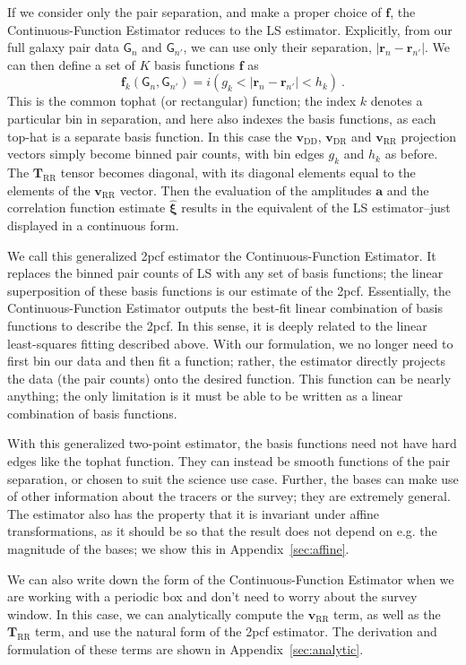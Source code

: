 \documentclass[modern]{aastex62}
\newcommand{\cf}{2pcf\xspace} %
\newcommand{\est}{the Continuous-Function Estimator\xspace}
\newcommand{\LS}{LS\xspace}
\newcommand{\bld}[1]{\bm{#1}} %
\newcommand{\vv}[1]{\bld{v}_\mathrm{#1}}
\newcommand{\TT}[1]{\bld{T}_\mathrm{#1}}
\newcommand{\ff}{\bld{f}}
\newcommand{\GG}[1]{\mathsf{G}_{#1}}
\begin{document}
If we consider only the pair separation, and make a proper choice of $\ff$, \est reduces to the \LS estimator.
Explicitly, from our full galaxy pair data $\GG{n}$ and $\GG{n'}$, we can use only their separation,  $|\bld{r}_n - \bld{r}_{n'}|$.
We can then define a set of $K$ basis functions $\ff$ as
\begin{equation}
\ff_k(\GG{n}, \GG{n'}) =  i(g_k < |\bld{r}_n - \bld{r}_{n'}| < h_k) ~.
\end{equation}
This is the common tophat (or rectangular) function; the index $k$ denotes a particular bin in separation, and here also indexes the basis functions, as each top-hat is a separate basis function.
In this case the $\vv{DD}$, $\vv{DR}$ and $\vv{RR}$ projection vectors simply become binned pair counts, with bin edges $g_k$ and $h_k$ as before.
The $\TT{RR}$ tensor becomes diagonal, with its diagonal elements equal to the elements of the $\vv{RR}$ vector.
Then the evaluation of the amplitudes $\bld{a}$ and the correlation function estimate $\bld{\hat{\xi}}$ results in the equivalent of the \LS estimator--just displayed in a continuous form.

We call this generalized \cf estimator \est.
It replaces the binned pair counts of \LS with any set of basis functions; the linear superposition of these basis functions is our estimate of the \cf.
Essentially, \est outputs the best-fit linear combination of basis functions to describe the \cf.
In this sense, it is deeply related to the linear least-squares fitting described above.
With our formulation, we no longer need to first bin our data and then fit a function; rather, the estimator directly projects the data (the pair counts) onto the desired function.
This function can be nearly anything; the only limitation is it must be able to be written as a linear combination of basis functions.

With this generalized two-point estimator, the basis functions need not have hard edges like the tophat function.
They can instead be smooth functions of the pair separation, or chosen to suit the science use case.
Further, the bases can make use of other information about the tracers or the survey; they are extremely general.
The estimator also has the property that it is invariant under affine transformations, as it should be so that the result does not depend on e.g. the magnitude of the bases; we show this in Appendix~\ref{sec:affine}.

We can also write down the form of \est when we are working with a periodic box and don't need to worry about the survey window.
In this case, we can analytically compute the $\vv{RR}$ term, as well as the $\TT{RR}$ term, and use the natural form of the \cf estimator.
The derivation and formulation of these terms are shown in Appendix~\ref{sec:analytic}.
\end{document}
